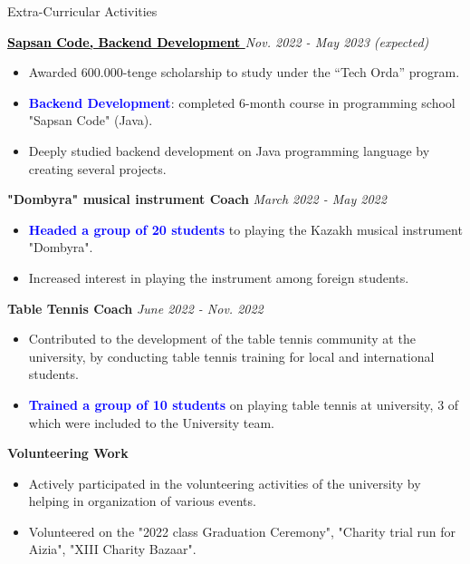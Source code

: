 \documentclass{resume} %
\begin{document}
\begin{rSection}{Extra-Curricular Activities} 

\href{https://astanahub.com/en/l/TechOrdaStudents}{\textbf{\large \textcolor{black}{Sapsan Code, Backend Development {\small \faExternalLink} } } }  \hfill \textit {Nov. 2022 - May 2023 (expected)} 
\vspace{-4pt}
\begin{itemize}
    \itemsep -5pt 
     \item Awarded 600.000-tenge scholarship to study under the “Tech Orda” program.
     \item \textcolor{blue}{\textbf{Backend Development}}: completed 6-month course in programming school "Sapsan Code" (Java). 
     \item Deeply studied backend development on Java programming language by creating several projects.
 \end{itemize}

\textbf{\large "Dombyra" musical instrument Coach} \hfill \textit {March 2022 - May 2022}
\vspace{-4pt}
\begin{itemize}
    \itemsep -5pt
     \item \textcolor{blue}{\textbf{Headed a group of 20 students}} to playing the Kazakh musical instrument "Dombyra".
     \item Increased interest in playing the instrument among foreign students.
 \end{itemize}

\textbf{\large Table Tennis Coach} \hfill \textit {June 2022 - Nov. 2022}
\vspace{-4pt}
\begin{itemize}
    \itemsep -5pt
     \item Contributed to the development of the table tennis community at the university, by conducting table tennis training for local and international students.
      \item \textcolor{blue}{\textbf{Trained a group of 10 students}} on playing table tennis at university, 3 of which were included to the University team.
 \end{itemize}
 
\textbf{\large Volunteering Work}
\vspace{-4pt}
\begin{itemize}
    \itemsep -5pt 
     \item Actively participated in the volunteering activities of the university by helping in organization of various events. 
     \item Volunteered on the "2022 class Graduation Ceremony", "Charity trial run for Aizia", "XIII Charity Bazaar".
 \end{itemize}
 


\end{rSection}
\end{document}
